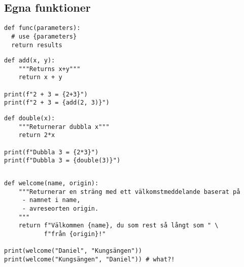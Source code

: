 \subsection{Egna funktioner}

\begin{frame}[fragile]
    \begin{verbatim}
def func(parameters):
  # use {parameters}
  return results
  \end{verbatim}
\end{frame}

\begin{frame}[fragile]
  \begin{example}[Addition]
  \begin{verbatim}
def add(x, y):
    """Returns x+y"""
    return x + y

print(f"2 + 3 = {2+3}")
print(f"2 + 3 = {add(2, 3)}")
    \end{verbatim}
  \end{example}
\end{frame}

\begin{frame}[fragile]
  \begin{example}[Dubblera]
    \begin{verbatim}
def double(x):
    """Returnerar dubbla x"""
    return 2*x

print(f"Dubbla 3 = {2*3}")
print(f"Dubbla 3 = {double(3)}")
    \end{verbatim}
  \end{example}
\end{frame}

\begin{frame}[fragile]
  \begin{example}
    \inputminted[linenos]{python}{examples/degees.py}
  \end{example}
\end{frame}

\begin{frame}[fragile]
  \begin{example}[Välkomsttext]
    \begin{verbatim}
def welcome(name, origin):
    """Returnerar en sträng med ett välkomstmeddelande baserat på
     - namnet i name,
     - avreseorten origin.
    """
    return f"Välkommen {name}, du som rest så långt som " \
           f"från {origin}!"

print(welcome("Daniel", "Kungsängen"))
print(welcome("Kungsängen", "Daniel")) # what?!
    \end{verbatim}
  \end{example}
\end{frame}


